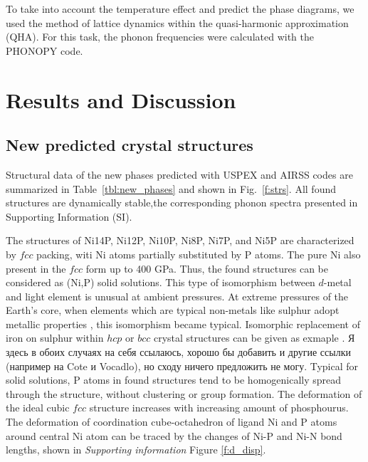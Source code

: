 \documentclass[twoside,twocolumn,9pt]{article}
\begin{document}
To take into account the temperature effect and predict the phase diagrams, we used the method of lattice dynamics within the quasi-harmonic approximation (QHA). 
For this task, the phonon frequencies were calculated with the PHONOPY code.\cite{phonopy}



\section{Results and Discussion}

\subsection{New predicted crystal structures}
Structural data of the new phases predicted with USPEX and AIRSS codes are summarized in Table~\ref{tbl:new_phases} and shown in Fig.~\ref{f:strs}. All found structures are dynamically stable,the corresponding phonon spectra presented in Supporting Information (SI).  

The structures of Ni14P, Ni12P, Ni10P, Ni8P, Ni7P, and Ni5P are characterized by $fcc$ packing, witi Ni atoms partially substituted by P atoms. 
The pure Ni also present in the $fcc$ form up to 400 GPa.
Thus, the found structures can be considered as (Ni,P) solid solutions.
This type of isomorphism between $d$-metal and light element is unusual at ambient pressures.
At extreme pressures of the Earth's core, when elements which are typical non-metals like sulphur adopt metallic properties \cite{gavr2017_s}, this isomorphism became typical.
Isomorphic replacement of iron on sulphur within $hcp$ or $bcc$ crystal structures can be given as exmaple \cite{gavr2016_fes}.
Я здесь в обоих случаях на себя ссылаюсь, хорошо бы добавить и другие ссылки (например на Cote и Vocadlo), но сходу ничего предложить не могу.
Typical for solid solutions, P atoms in found structures tend to be homogenically spread through the structure, without clustering or group formation.
The deformation of the ideal cubic $fcc$ structure increases with increasing amount of phosphourus.
The deformation of coordination cube-octahedron of ligand Ni and P atoms around central Ni atom can be traced by the changes of Ni-P and Ni-N bond lengths, shown in {\it Supporting information} Figure \ref{f:d_disp}.
\end{document}

